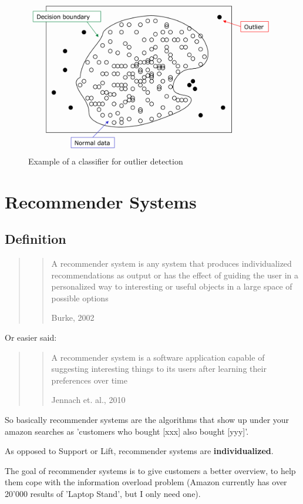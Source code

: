 \documentclass[11pt]{article}
\begin{document}
\begin{figure}[tbh!]
    \centering
    \includegraphics[width=0.7\linewidth, keepaspectratio]{Pictures/outlier_clustering_method_classification}
    \caption{Example of a classifier for outlier detection}
    \label{fig:outlierclusteringmethodclassification}
\end{figure}

\section{Recommender Systems}

\subsection{Definition}

\begin{quote}
    \blockquote[Burke, 2002]{A recommender system is any system that produces individualized recommendations as output or has the effect of guiding the user in a personalized way to interesting or useful objects in a large space of possible options}
\end{quote}

Or easier said:

\begin{quote}
    \blockquote[Jennach et. al., 2010]{A recommender system is a software application capable of suggesting interesting things to its users after learning their preferences over time}
\end{quote}

So basically recommender systems are the algorithms that show up under your amazon searches as 'customers who bought [xxx] also bought [yyy]'.

As opposed to Support or Lift, recommender systems are \textbf{individualized}.

\vspace{10px}

The goal of recommender systems is to give customers a better overview, to help them cope with the information overload problem (Amazon currently has over 20'000 results of 'Laptop Stand', but I only need one).
\end{document}
